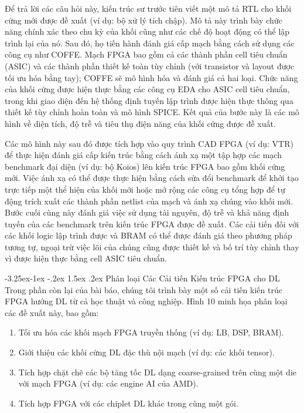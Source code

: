 \documentclass[a4paper]{article}
\makeatletter
\newcounter {subsubsubsection}[subsubsection]
\newcommand\subsubsubsection{\@startsection{subsubsubsection}{4}{\z@}%
                                     {-3.25ex\@plus -1ex \@minus -.2ex}%
                                     {1.5ex \@plus .2ex}%
                                     {\normalfont\normalsize\bfseries}}
\makeatother
\begin{document}
Để trả lời các câu hỏi này, kiến trúc sư trước tiên viết một mô tả RTL cho khối cứng mới được đề xuất (ví dụ: bộ xử lý tích chập). Mô tả này trình bày chức năng chính xác theo chu kỳ của khối cũng như các chế độ hoạt động có thể lập trình lại của nó. Sau đó, họ tiến hành đánh giá cấp mạch bằng cách sử dụng các công cụ như COFFE. Mạch FPGA bao gồm cả các thành phần cell tiêu chuẩn (ASIC) và các thành phần thiết kế toàn tùy chỉnh (với transistor và layout được tối ưu hóa bằng tay); COFFE sẽ mô hình hóa và đánh giá cả hai loại. Chức năng của khối cứng được hiện thực bằng các công cụ EDA cho ASIC cell tiêu chuẩn, trong khi giao diện đến hệ thống định tuyến lập trình được hiện thực thông qua thiết kế tùy chỉnh hoàn toàn và mô hình SPICE. Kết quả của bước này là các mô hình về diện tích, độ trễ và tiêu thụ điện năng của khối cứng được đề xuất.

Các mô hình này sau đó được tích hợp vào quy trình CAD FPGA (ví dụ: VTR) để thực hiện đánh giá cấp kiến trúc bằng cách ánh xạ một tập hợp các mạch benchmark đại diện (ví dụ: bộ Koios) lên kiến trúc FPGA bao gồm khối cứng mới. Việc ánh xạ có thể được thực hiện bằng cách sửa đổi benchmark để khởi tạo trực tiếp một thể hiện của khối mới hoặc mở rộng các công cụ tổng hợp để tự động trích xuất các thành phần netlist của mạch và ánh xạ chúng vào khối mới. Bước cuối cùng này đánh giá việc sử dụng tài nguyên, độ trễ và khả năng định tuyến của các benchmark trên kiến trúc FPGA được đề xuất. Các cải tiến đối với các khối logic lập trình được và BRAM có thể được đánh giá theo phương pháp tương tự, ngoại trừ việc lõi của chúng cũng được thiết kế và bố trí tùy chỉnh thay vì được hiện thực bằng cell ASIC tiêu chuẩn.

\subsubsubsection{Phân loại Các Cải tiến Kiến trúc FPGA cho DL}
Trong phần còn lại của bài báo, chúng tôi trình bày một số cải tiến kiến trúc FPGA hướng DL từ cả học thuật và công nghiệp. Hình 10 minh họa phân loại các đề xuất này, bao gồm:
\begin{enumerate}
    \item Tối ưu hóa các khối mạch FPGA truyền thống (ví dụ: LB, DSP, BRAM).
    \item Giới thiệu các khối cứng DL đặc thù nội mạch (ví dụ: các khối tensor).
    \item Tích hợp chặt chẽ các bộ tăng tốc DL dạng coarse-grained trên cùng một die với mạch FPGA (ví dụ: các engine AI của AMD).
    \item Tích hợp FPGA với các chiplet DL khác trong cùng một gói.
\end{enumerate}
\end{document}
